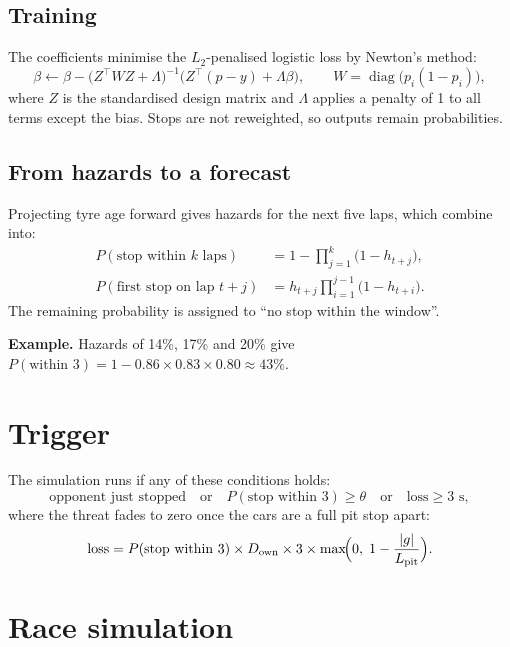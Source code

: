\documentclass[11pt,a4paper]{article}
\begin{document}
\subsection{Training}
The coefficients minimise the $L_2$-penalised logistic loss by Newton's method:
\begin{equation}
\beta \leftarrow \beta -
\bigl(Z^{\top} W Z + \Lambda\bigr)^{-1}
\bigl(Z^{\top}(p-y) + \Lambda\beta\bigr),
\qquad W = \operatorname{diag}\bigl(p_i(1-p_i)\bigr),
\end{equation}
where $Z$ is the standardised design matrix and $\Lambda$ applies a penalty of 1 to all
terms except the bias. Stops are not reweighted, so outputs remain probabilities.

\subsection{From hazards to a forecast}
Projecting tyre age forward gives hazards for the next five laps, which combine into:
\begin{align}
P(\text{stop within } k \text{ laps}) &= 1 - \prod_{j=1}^{k}\bigl(1-h_{t+j}\bigr),\\
P(\text{first stop on lap } t+j) &= h_{t+j}\prod_{i=1}^{j-1}\bigl(1-h_{t+i}\bigr).
\end{align}
The remaining probability is assigned to ``no stop within the window''.

\textbf{Example.} Hazards of 14\%, 17\% and 20\% give
$P(\text{within 3}) = 1 - 0.86\times0.83\times0.80 \approx 43\%$.

\section{Trigger}

The simulation runs if any of these conditions holds:
\begin{equation}
\text{opponent just stopped}
\quad\text{or}\quad
P(\text{stop within 3}) \ge \theta
\quad\text{or}\quad
\text{loss} \ge 3\text{ s},
\end{equation}
where the threat fades to zero once the cars are a full pit stop apart:
\begin{equation}
\text{loss} = P(\text{stop within 3}) \times D_{\text{own}} \times 3 \times
\max\!\Bigl(0,\;1-\frac{|g|}{L_{\text{pit}}}\Bigr).
\end{equation}

\section{Race simulation}
\end{document}
